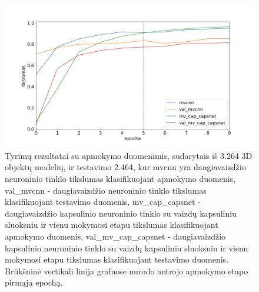 \begin{figure}[H]
	\centering
	\includegraphics[scale=0.5]{img/less_data_v2.png}
	\caption{
		Tyrimų rezultatai su apmokymo duomenimis, sudarytais iš 3.264 3D objektų modelių, ir testavimo 2.464, kur mvcnn yra daugiavaizdžio neuroninio tinklo tikslumas klasifikuojant apmokymo duomenis, val\_mvcnn - daugiavaizdžio neuroninio tinklo tikslumas klasifikuojant testavimo duomenis, mv\_cap\_capsnet - daugiavaizdžio kapsulinio neuroninio tinklo su vaizdų kapsuliniu sluoksniu ir vienu mokymosi etapu tikslumas klasifikuojant apmokymo duomenis, val\_mv\_cap\_capsnet - daugiavaizdžio kapsulinio neuroninio tinklo su vaizdų kapsuliniu sluoksniu ir vienu mokymosi etapu tikslumas klasifikuojant testavimo duomenis.	Brūkšninė vertikali linija grafuose nurodo antrojo apmokymo etapo pirmąją epochą.
	}
	\label{img:less_datav2}
\end{figure}


